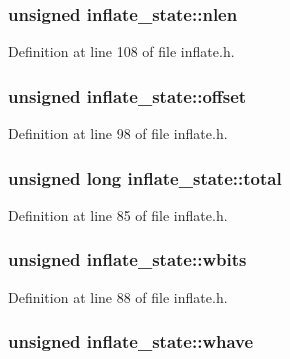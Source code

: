 \hypertarget{structinflate__state_a489b005f4fe214353cd80b77b4f23194}{
\subsubsection[{nlen}]{\setlength{\rightskip}{0pt plus 5cm}unsigned inflate\-\_\-state\-::nlen}}\label{structinflate__state_a489b005f4fe214353cd80b77b4f23194}


Definition at line 108 of file inflate.\-h.

\hypertarget{structinflate__state_af1e38258e8585b1a37854066ef9d939c}{
\subsubsection[{offset}]{\setlength{\rightskip}{0pt plus 5cm}unsigned inflate\-\_\-state\-::offset}}\label{structinflate__state_af1e38258e8585b1a37854066ef9d939c}


Definition at line 98 of file inflate.\-h.

\hypertarget{structinflate__state_af9d1071eb75b1ee37a151ccec8dfee95}{
\subsubsection[{total}]{\setlength{\rightskip}{0pt plus 5cm}unsigned {\bf long} inflate\-\_\-state\-::total}}\label{structinflate__state_af9d1071eb75b1ee37a151ccec8dfee95}


Definition at line 85 of file inflate.\-h.

\hypertarget{structinflate__state_a71f844b589ac450f17d69f3692a8c5cc}{
\subsubsection[{wbits}]{\setlength{\rightskip}{0pt plus 5cm}unsigned inflate\-\_\-state\-::wbits}}\label{structinflate__state_a71f844b589ac450f17d69f3692a8c5cc}


Definition at line 88 of file inflate.\-h.

\hypertarget{structinflate__state_a6b56aabe80412784eadc1068981c9d00}{
\subsubsection[{whave}]{\setlength{\rightskip}{0pt plus 5cm}unsigned inflate\-\_\-state\-::whave}}\label{structinflate__state_a6b56aabe80412784eadc1068981c9d00}



